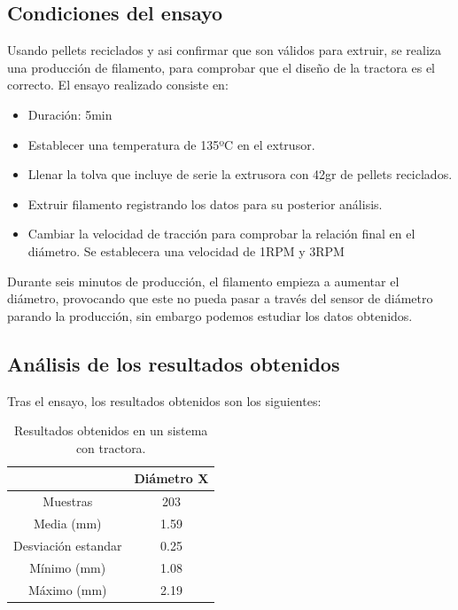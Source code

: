 \subsection{Condiciones del ensayo}

Usando pellets reciclados y asi confirmar que son válidos para extruir, se realiza una producción de filamento, para comprobar que el diseño de la tractora es el correcto. El ensayo realizado consiste en:

\begin{itemize}
    \item {Duración: 5min}
    \item{Establecer una temperatura de 135ºC en el extrusor.}
    \item{Llenar la tolva que incluye de serie la extrusora con 42gr de pellets reciclados.}
    \item{Extruir filamento registrando los datos para su posterior análisis.}
    \item{Cambiar la velocidad de tracción para comprobar la relación final en el diámetro. Se establecera una velocidad de 1RPM y 3RPM}
\end{itemize}

Durante seis minutos  de producción, el filamento empieza a aumentar el diámetro, provocando que este no pueda pasar a través del sensor de diámetro parando la producción, sin embargo podemos estudiar los datos obtenidos.


\subsection{Análisis de los resultados obtenidos}
Tras el ensayo, los resultados obtenidos son los siguientes:

\begin{table}[H]
    \centering
    \begin{tabular}{cc}
                   & Diámetro X \\ \hline
        Muestras    & 203        \\
        Media (mm) & 1.59       \\
        Desviación estandar & 0.25\\
        Mínimo (mm)   & 1.08       \\
        Máximo (mm)   & 2.19      
    \end{tabular}
    \caption{Resultados obtenidos en un sistema con tractora.}
    \label{tab:20007105-dat}
\end{table}

